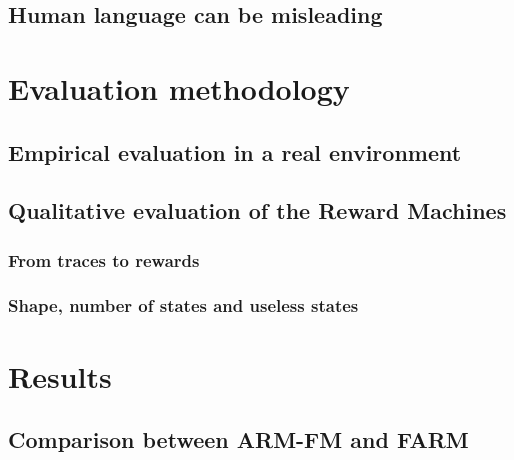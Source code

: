 \documentclass[11pt,english,listoffigures,listoftables, listofalgorithms]{tfgetsinf}
\begin{document}
\section{Human language can be misleading}


\chapter{Evaluation methodology}
\label{chap:evaluation}
\section{Empirical evaluation in a real environment}
\section{Qualitative evaluation of the Reward Machines}
\subsection{From traces to rewards}
\subsection{Shape, number of states and useless states}


\chapter{Results}
\label{chap:results}
\section{Comparison between ARM-FM and FARM}

\end{document}
